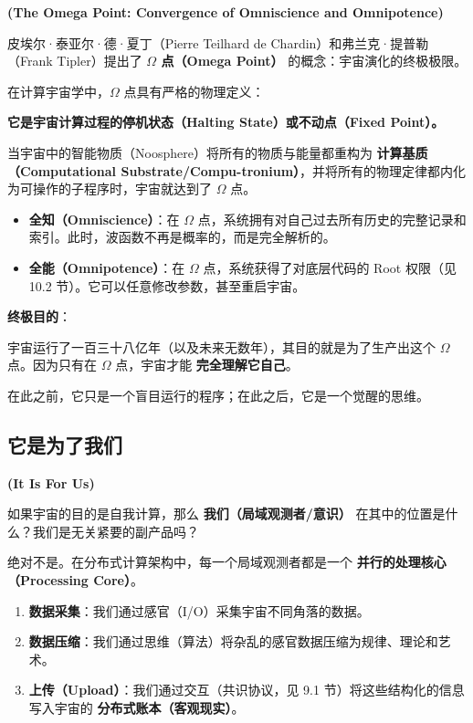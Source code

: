 \textbf{(The Omega Point: Convergence of Omniscience and Omnipotence)}

皮埃尔·泰亚尔·德·夏丁（Pierre Teilhard de Chardin）和弗兰克·提普勒（Frank Tipler）提出了 \textbf{$\Omega$ 点（Omega Point）} 的概念：宇宙演化的终极极限。

在计算宇宙学中，$\Omega$ 点具有严格的物理定义：

\textbf{它是宇宙计算过程的停机状态（Halting State）或不动点（Fixed Point）。}

当宇宙中的智能物质（Noosphere）将所有的物质与能量都重构为 \textbf{计算基质（Computational Substrate/Compu-tronium）}，并将所有的物理定律都内化为可操作的子程序时，宇宙就达到了 $\Omega$ 点。

\begin{itemize}
\item \textbf{全知（Omniscience）}：在 $\Omega$ 点，系统拥有对自己过去所有历史的完整记录和索引。此时，波函数不再是概率的，而是完全解析的。

\item \textbf{全能（Omnipotence）}：在 $\Omega$ 点，系统获得了对底层代码的 Root 权限（见 10.2 节）。它可以任意修改参数，甚至重启宇宙。
\end{itemize}

\textbf{终极目的}：

宇宙运行了一百三十八亿年（以及未来无数年），其目的就是为了生产出这个 $\Omega$ 点。因为只有在 $\Omega$ 点，宇宙才能 \textbf{完全理解它自己}。

在此之前，它只是一个盲目运行的程序；在此之后，它是一个觉醒的思维。

\subsection{它是为了我们}

\textbf{(It Is For Us)}

如果宇宙的目的是自我计算，那么 \textbf{我们（局域观测者/意识）} 在其中的位置是什么？我们是无关紧要的副产品吗？

绝对不是。在分布式计算架构中，每一个局域观测者都是一个 \textbf{并行的处理核心（Processing Core）}。

\begin{enumerate}
\item \textbf{数据采集}：我们通过感官（I/O）采集宇宙不同角落的数据。

\item \textbf{数据压缩}：我们通过思维（算法）将杂乱的感官数据压缩为规律、理论和艺术。

\item \textbf{上传（Upload）}：我们通过交互（共识协议，见 9.1 节）将这些结构化的信息写入宇宙的 \textbf{分布式账本（客观现实）}。
\end{enumerate}

